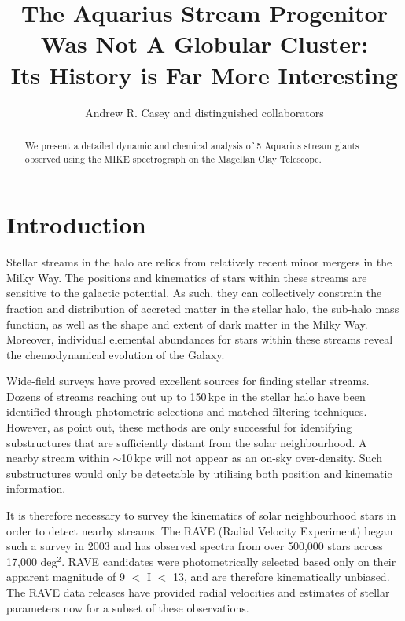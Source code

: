 \documentclass{emulateapj}
\begin{document}
\title{The Aquarius Stream Progenitor Was Not A Globular Cluster: \\ Its History is Far More Interesting}


\author{Andrew R. Casey and distinguished collaborators}


\begin{abstract}
We present a detailed dynamic and chemical analysis of 5 Aquarius stream giants observed using the MIKE spectrograph on the Magellan Clay Telescope. 
\end{abstract}


\section{Introduction}

Stellar streams in the halo are relics from relatively recent minor mergers in the Milky Way. The positions and kinematics of stars within these streams are sensitive to the galactic potential. As such, they can collectively constrain the fraction and distribution of accreted matter in the stellar halo, the sub-halo mass function, as well as the shape and extent of dark matter in the Milky Way. Moreover, individual elemental abundances for stars within these streams reveal the chemodynamical evolution of the Galaxy. 

Wide-field surveys have proved excellent sources for finding stellar streams. Dozens of streams reaching out up to 150\,kpc in the stellar halo have been identified through photometric selections and matched-filtering techniques. However, as \citet{Helmi;White_1999} point out, these methods are only successful for identifying substructures that are sufficiently distant from the solar neighbourhood. A nearby stream within $\sim{}$10\,kpc will not appear as an on-sky over-density. Such substructures would only be detectable by utilising both position and kinematic information. 

It is therefore necessary to survey the kinematics of solar neighbourhood stars in order to detect nearby streams. The RAVE (Radial Velocity Experiment) began such a survey in 2003 and has observed spectra from over 500,000 stars across 17,000 deg$^{2}$. RAVE candidates were photometrically selected based only on their apparent magnitude of 9 $<$ I $<$ 13, and are therefore kinematically unbiased. The RAVE data releases have provided radial velocities \citep{steinmetz;et-al_2006} and estimates of stellar parameters \citep{zwitter;et-al_2008, siebert;et-al_2011} now for a subset of these observations. 
\end{document}
